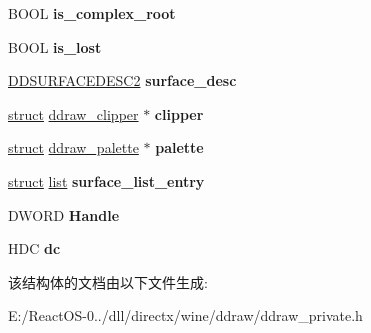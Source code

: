 \begin{DoxyCompactItemize}
\item 
\mbox{\label{structddraw__surface_a77653cd9f227640e517a2d4e58d42545}} 
B\+O\+OL {\bfseries is\+\_\+complex\+\_\+root}
\item 
\mbox{\label{structddraw__surface_a7ccf4d1e5646f4e2486871b11f765e26}} 
B\+O\+OL {\bfseries is\+\_\+lost}
\item 
\mbox{\label{structddraw__surface_a595e650aca71f5759534a784bb1eb1e1}} 
\hyperlink{struct___d_d_s_u_r_f_a_c_e_d_e_s_c2}{D\+D\+S\+U\+R\+F\+A\+C\+E\+D\+E\+S\+C2} {\bfseries surface\+\_\+desc}
\item 
\mbox{\label{structddraw__surface_a3f3c7068af1745669dac68e6bb96e2d0}} 
\hyperlink{interfacestruct}{struct} \hyperlink{structddraw__clipper}{ddraw\+\_\+clipper} $\ast$ {\bfseries clipper}
\item 
\mbox{\label{structddraw__surface_acc09111ae037f0b5dc038bd020ee6848}} 
\hyperlink{interfacestruct}{struct} \hyperlink{structddraw__palette}{ddraw\+\_\+palette} $\ast$ {\bfseries palette}
\item 
\mbox{\label{structddraw__surface_ae18b3a5017737e22703108b368ab3772}} 
\hyperlink{interfacestruct}{struct} \hyperlink{classlist}{list} {\bfseries surface\+\_\+list\+\_\+entry}
\item 
\mbox{\label{structddraw__surface_a20e24d048c293a67c570c715640bc296}} 
D\+W\+O\+RD {\bfseries Handle}
\item 
\mbox{\label{structddraw__surface_addc32da29fccab2200db8dd410f92463}} 
H\+DC {\bfseries dc}
\end{DoxyCompactItemize}


该结构体的文档由以下文件生成\+:\begin{DoxyCompactItemize}
\item 
E\+:/\+React\+O\+S-\/0../dll/directx/wine/ddraw/ddraw\+\_\+private.\+h\end{DoxyCompactItemize}
